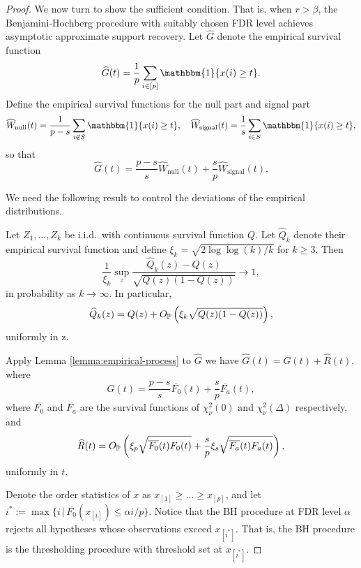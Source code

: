 \begin{proof}
We now turn to show the sufficient condition. 
That is, when $r > \beta$, the Benjamini-Hochberg procedure with suitably chosen FDR level achieves asymptotic approximate support recovery.
Let $\widehat{G}$ denote the empirical survival function
\begin{equation} \label{eq:empirical-survival}
    \widehat{G}(t) = \frac{1}{p}\sum_{i\in[p]}\mathbbm{1}\{x(i) \ge t\}.
\end{equation}
Define the empirical survival functions for the null part and signal part
\begin{equation} \label{eq:empirical-survival-null-signal}
    \widehat{W}_\text{null}(t) = \frac{1}{p-s}\sum_{i\not\in S}\mathbbm{1}\{x(i) \ge t\},
    \quad
    \widehat{W}_\text{signal}(t) = \frac{1}{s}\sum_{i\in S}\mathbbm{1}\{x(i) \ge t\},
\end{equation}
so that
$$
\widehat{G}(t) = \frac{p-s}{s}\widehat{W}_\text{null}(t) + \frac{s}{p}\widehat{W}_\text{signal}(t).
$$

We need the following result to control the deviations of the empirical distributions.
\begin{lemma} \label{lemma:empirical-process}
Let $Z_1,\ldots,Z_k$ be i.i.d.\ with continuous survival function $Q$.
Let $\widehat{Q}_k$ denote their empirical survival function and define 
$\xi_k = \sqrt{2\log{\log{(k)}}/k}$ for $k \ge 3$. 
Then
$$
\frac{1}{\xi_k}\sup_z\frac{\widehat{Q}_k(z) - Q(z)}{\sqrt{Q(z)(1 - Q(z))}} \to 1,
$$
in probability as $k \to \infty$.
In particular,
$$
\widehat{Q}_k(z) = Q(z) + O_\P\left(\xi_k\sqrt{Q(z)(1 - Q(z))}\right),
$$
uniformly in z.
\end{lemma}

Apply Lemma \ref{lemma:empirical-process} to $\widehat{G}$ we have
$\widehat{G}(t) = G(t) + \widehat{R}(t)$.
where 
\begin{equation} \label{eq:empirical-process-mean}
    G(t) = \frac{p-s}{s}\overline{F_0}(t) + \frac{s}{p}\overline{F_a}(t),
\end{equation}
where $\overline{F_0}$ and $\overline{F_a}$ are the survival functions of $\chi_\nu^2(0)$ and $\chi_\nu^2(\Delta)$ respectively, and 
\begin{equation} \label{eq:empirical-process-residual}
    \widehat{R}(t) = O_\P\left(\xi_p\sqrt{\overline{F_0}(t)F_0(t)} + \frac{s}{p}\xi_s\sqrt{\overline{F_a}(t)F_a(t)}\right),
\end{equation}
uniformly in $t$.

Denote the order statistics of $x$ as $x_{[1]}\ge\ldots\ge x_{[p]}$, and let $i^* := \max\{i\,|\,\overline{F_0}(x_{[i]})\le \alpha i/p\}$.
Notice that the BH procedure at FDR level $\alpha$ rejects all hypotheses whose observations exceed $x_{[i^*]}$. 
That is, the BH procedure is the thresholding procedure with threshold set at $x_{[i^*]}$.


\end{proof}
